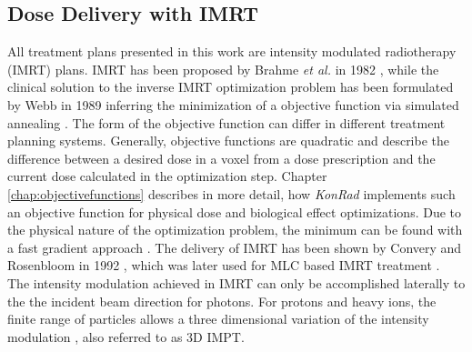 \subsection{Dose Delivery with IMRT}
All treatment plans presented in this work are intensity modulated radiotherapy (IMRT) plans. IMRT has been proposed by Brahme \textit{et al.} in 1982 \cite{pmid7146095}, while the clinical solution to the inverse IMRT optimization problem has been formulated by Webb in 1989 \cite{pmid2682694} inferring the minimization of a objective function via simulated annealing \cite{pmid16790913}. The form of the objective function can differ in different treatment planning systems. Generally, objective functions are quadratic and describe the difference between a desired dose in a voxel from a dose prescription and the current dose calculated in the optimization step. Chapter \ref{chap:objectivefunctions} describes in more detail, how \textit{KonRad} implements such an objective function for physical dose and biological effect optimizations. Due to the physical nature of the optimization problem, the minimum can be found with a fast gradient approach \cite{pmid2243845}. The delivery of IMRT has been shown by Convery and Rosenbloom in 1992 \cite{Convery_Rosebloom_1992}, which was later used for MLC based IMRT treatment \cite{pmid8690638}. \\The intensity modulation achieved in IMRT can only be accomplished laterally to the the incident beam direction for photons. For protons and heavy ions, the finite range of particles allows a three dimensional variation of the intensity modulation \cite{pmid10071883}, also referred to as 3D IMPT.
